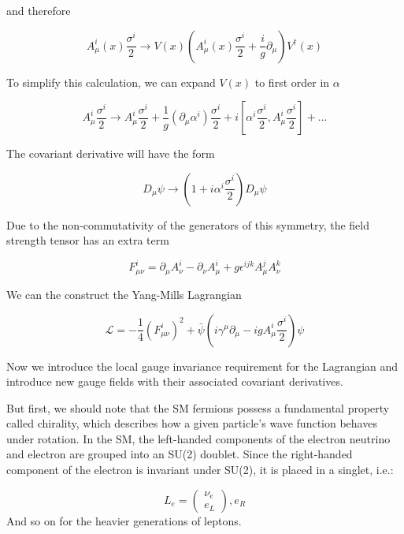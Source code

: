 and therefore

\begin{equation}
A_{\mu}^{i}(x)\frac{\sigma^{i}}{2}\rightarrow V(x)(A_{\mu}^{i}(x)\frac{\sigma^{i}}{2}+\frac{i}{g}\partial_{\mu})V^{\dagger}(x)
\end{equation}

To simplify this calculation, we can expand $V(x)$ to first order in $\alpha$ 

\begin{equation}
A_{\mu}^{i}\frac{\sigma^{i}}{2}\rightarrow A_{\mu}^{i}\frac{\sigma^{i}}{2} + \frac{1}{g}(\partial_{\mu}\alpha^{i})\frac{\sigma^{i}}{2} + i[\alpha^{i}\frac{\sigma^{i}}{2}, A_{\mu}^{i}\frac{\sigma^{i}}{2}] + ...
\end{equation}

The covariant derivative will have the form

\begin{equation}
D_{\mu}\psi\rightarrow(1+i\alpha^{i}\frac{\sigma^{i}}{2})D_{\mu}\psi
\end{equation}

Due to the non-commutativity of the generators of this symmetry, the field strength tensor has an extra term

\begin{equation}
F_{\mu\nu}^{i} = \partial_{\mu}A_{\nu}^{i} - \partial_{\nu}A_{\mu}^{i} + g\epsilon^{ijk}A_{\mu}^{j}A_{\nu}^{k}
\end{equation}

We can the construct the Yang-Mills Lagrangian

\begin{equation}
\mathcal{L} = -\frac{1}{4}(F_{\mu\nu}^{i})^{2}+\bar{\psi}(i\gamma^{\mu}\partial_{\mu}-igA_{\mu}^{i}\frac{\sigma^{i}}{2})\psi
\end{equation}

Now we introduce the local gauge invariance requirement for the Lagrangian and introduce new gauge fields with their associated covariant derivatives.

But first, we should note that the SM fermions possess a fundamental property called chirality, which describes how a given particle's wave function behaves under rotation. In the SM, the left-handed components of the electron neutrino and electron are grouped into an SU(2) doublet. Since the right-handed component of the electron is invariant under SU(2), it is placed in a singlet, i.e.:

\begin{equation}
L_{e} = \begin{pmatrix}
	\nu_{e} \\
	e_{L}
\end{pmatrix}
, e_{R}
\end{equation}
 And so on for the heavier generations of leptons. 

